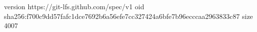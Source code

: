 version https://git-lfs.github.com/spec/v1
oid sha256:f700c9dd57fafc1dce7692b6a56efe7cc327424a6bfe7b96ecccaa2963833c87
size 4007
